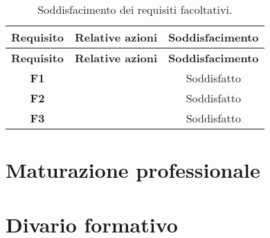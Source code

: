 \begin{longtable}{|c|p{11cm}|c}
    \caption{Soddisfacimento dei requisiti facoltativi.}
    \label{tab:soddReqFacoltativi}\\
    \hline \textbf{Requisito} & \textbf{Relative azioni} & \textbf{Soddisfacimento}\\ \hline \endfirsthead
    \hline \textbf{Requisito} & \textbf{Relative azioni} & \textbf{Soddisfacimento}\\ \hline \endhead
    \hline \endfoot
    \hline \endlastfoot
    \textbf{F1}  & & Soddisfatto\\
    \hline \textbf{F2}  & & Soddisfatto\\
    \hline \textbf{F3}  & & Soddisfatto\\
\end{longtable}

\section{Maturazione professionale}
%

\section{Divario formativo}
%

